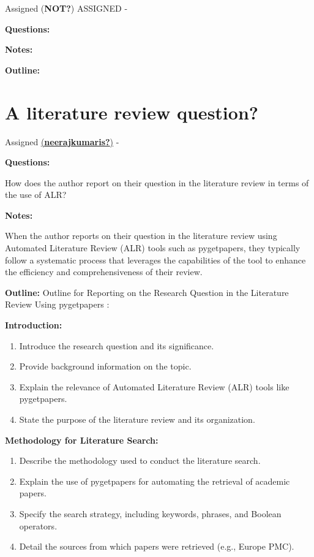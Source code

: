\documentclass[
  letterpaper,
  DIV=11,
  numbers=noendperiod]{scrreprt}
\providecommand{\tightlist}{%
  \setlength{\itemsep}{0pt}\setlength{\parskip}{0pt}}\usepackage{longtable,booktabs,array}
\begin{document}
Assigned (\textbf{NOT?}) ASSIGNED -

\textbf{Questions:}

\textbf{Notes:}

\textbf{Outline:}

\section{A literature review
question?}\label{a-literature-review-question}

Assigned
\href{https://github.com/neerajkumaris}{(\textbf{neerajkumaris?})} -

\textbf{Questions:}

How does the author report on their question in the literature review in
terms of the use of ALR?

\textbf{Notes:}

When the author reports on their question in the literature review using
Automated Literature Review (ALR) tools such as pygetpapers, they
typically follow a systematic process that leverages the capabilities of
the tool to enhance the efficiency and comprehensiveness of their
review.

\textbf{Outline:} Outline for Reporting on the Research Question in the
Literature Review Using pygetpapers :

\textbf{Introduction:}

\begin{enumerate}
\def\labelenumi{\arabic{enumi}.}
\tightlist
\item
  Introduce the research question and its significance.
\item
  Provide background information on the topic.
\item
  Explain the relevance of Automated Literature Review (ALR) tools like
  pygetpapers.
\item
  State the purpose of the literature review and its organization.
\end{enumerate}

\textbf{Methodology for Literature Search:}

\begin{enumerate}
\def\labelenumi{\arabic{enumi}.}
\tightlist
\item
  Describe the methodology used to conduct the literature search.
\item
  Explain the use of pygetpapers for automating the retrieval of
  academic papers.
\item
  Specify the search strategy, including keywords, phrases, and Boolean
  operators.
\item
  Detail the sources from which papers were retrieved (e.g., Europe
  PMC).
\end{enumerate}
\end{document}

